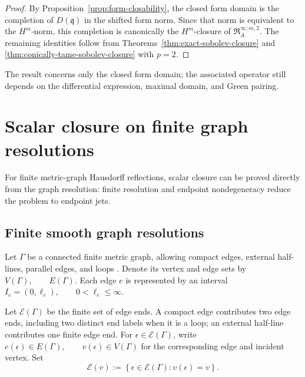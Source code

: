 \documentclass[11pt]{article}
\theoremstyle{plain}
\theoremstyle{definition}
\begin{document}
\begin{proof}
By
Proposition~\ref{prop:form-closability},
the closed form domain is the completion of \(D(\mathfrak q)\) in
the shifted form norm. Since that norm is equivalent to the
\(H^m\)-norm, this completion is canonically the \(H^m\)-closure of
\(\mathfrak R_A^{\infty;m,2}\).
The remaining identities follow from
Theorems~\ref{thm:exact-sobolev-closure}
and
\ref{thm:conically-tame-sobolev-closure}
with \(p=2\).
\end{proof}

The result concerns only the closed form domain; the associated operator still depends on the differential expression, maximal domain, and Green pairing.

\section{Scalar closure on finite graph resolutions}
\label{sec:graph-resolutions}

For finite metric-graph Hausdorff reflections, scalar closure can be proved directly from the graph resolution: finite resolution and endpoint nondegeneracy reduce the problem to endpoint jets.

\subsection{Finite smooth graph resolutions}
\label{subsec:finite-smooth-graph-resolutions}

Let \(\Gamma\) be a connected finite metric graph, allowing compact
edges, external half-lines, parallel edges, and loops
\citep{BerkolaikoKuchment2013}. Denote its vertex and edge sets by
\(V(\Gamma), \qquad E(\Gamma)\).
Each edge \(e\) is represented by an interval
\(I_e=(0,\ell_e), \qquad 0<\ell_e\leq\infty\).

Let \(\mathcal E(\Gamma)\) be the finite set of edge ends. A compact edge contributes two edge
ends, including two distinct end labels when it is a loop; an external
half-line contributes one finite edge end. For
\(\epsilon\in\mathcal E(\Gamma)\),
write \(e(\epsilon)\in E(\Gamma), \qquad v(\epsilon)\in V(\Gamma)\) for the corresponding edge and incident vertex. Set
\[
  \mathcal E(v)
  :=
  \left\{
    \epsilon\in\mathcal E(\Gamma):
    v(\epsilon)=v
  \right\}.
\]
\end{document}
